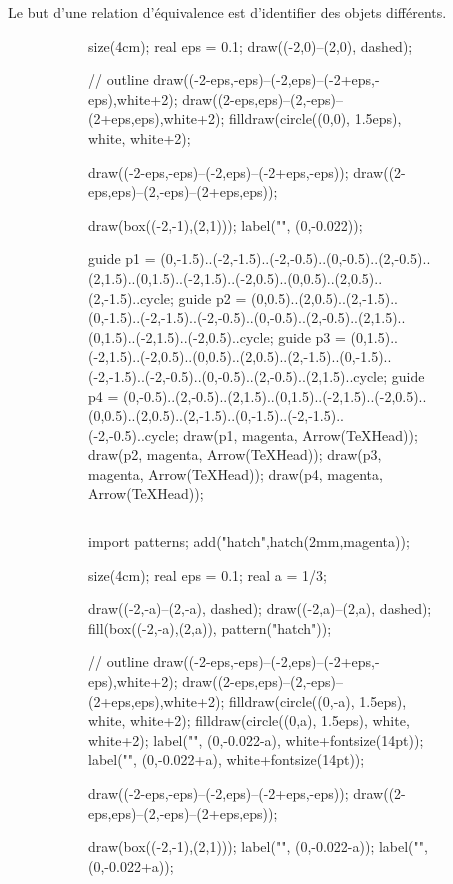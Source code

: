 \begin{rmk}
	Le but d'une relation d'équivalence est d'identifier des objets différents.

	\begin{figure}[H]
		\centering
		\begin{subfigure}{4cm}
			\begin{asy}
				size(4cm);
				real eps = 0.1;
				draw((-2,0)--(2,0), dashed);

				// outline
				draw((-2-eps,-eps)--(-2,eps)--(-2+eps,-eps),white+2);
				draw((2-eps,eps)--(2,-eps)--(2+eps,eps),white+2);
				filldraw(circle((0,0), 1.5eps), white, white+2);

				draw((-2-eps,-eps)--(-2,eps)--(-2+eps,-eps));
				draw((2-eps,eps)--(2,-eps)--(2+eps,eps));
				
				draw(box((-2,-1),(2,1)));
				label("", (0,-0.022));

				guide p1 = (0,-1.5)..(-2,-1.5)..(-2,-0.5)..(0,-0.5)..(2,-0.5)..(2,1.5)..(0,1.5)..(-2,1.5)..(-2,0.5)..(0,0.5)..(2,0.5)..(2,-1.5)..cycle;
				guide p2 = (0,0.5)..(2,0.5)..(2,-1.5)..(0,-1.5)..(-2,-1.5)..(-2,-0.5)..(0,-0.5)..(2,-0.5)..(2,1.5)..(0,1.5)..(-2,1.5)..(-2,0.5)..cycle;
				guide p3 = (0,1.5)..(-2,1.5)..(-2,0.5)..(0,0.5)..(2,0.5)..(2,-1.5)..(0,-1.5)..(-2,-1.5)..(-2,-0.5)..(0,-0.5)..(2,-0.5)..(2,1.5)..cycle;
				guide p4 = (0,-0.5)..(2,-0.5)..(2,1.5)..(0,1.5)..(-2,1.5)..(-2,0.5)..(0,0.5)..(2,0.5)..(2,-1.5)..(0,-1.5)..(-2,-1.5)..(-2,-0.5)..cycle;
				draw(p1, magenta, Arrow(TeXHead));
				draw(p2, magenta, Arrow(TeXHead));
				draw(p3, magenta, Arrow(TeXHead));
				draw(p4, magenta, Arrow(TeXHead));
			\end{asy}
		\end{subfigure}
			$\qquad\qquad\qquad$
		\begin{subfigure}{4cm}
			\begin{asy}
				import patterns;
				add("hatch",hatch(2mm,magenta));

				size(4cm);
				real eps = 0.1;
				real a = 1/3;

				draw((-2,-a)--(2,-a), dashed);
				draw((-2,a)--(2,a), dashed);
				fill(box((-2,-a),(2,a)), pattern("hatch"));

				// outline
				draw((-2-eps,-eps)--(-2,eps)--(-2+eps,-eps),white+2);
				draw((2-eps,eps)--(2,-eps)--(2+eps,eps),white+2);
				filldraw(circle((0,-a), 1.5eps), white, white+2);
				filldraw(circle((0,a), 1.5eps), white, white+2);
				label("", (0,-0.022-a), white+fontsize(14pt));
				label("", (0,-0.022+a), white+fontsize(14pt));

				draw((-2-eps,-eps)--(-2,eps)--(-2+eps,-eps));
				draw((2-eps,eps)--(2,-eps)--(2+eps,eps));
				
				draw(box((-2,-1),(2,1)));
				label("", (0,-0.022-a));
				label("", (0,-0.022+a));
			\end{asy}
		\end{subfigure}
	\end{figure}
\end{rmk}

